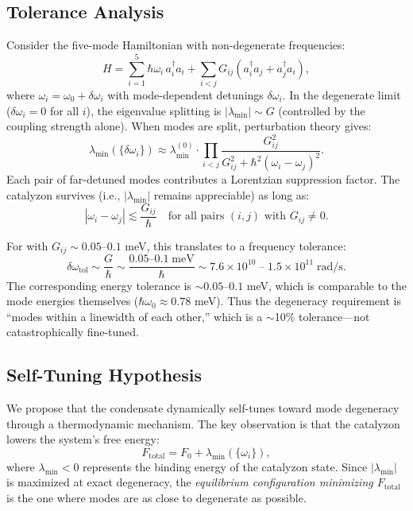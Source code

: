 \documentclass[11pt,letterpaper]{article}
\begin{document}
\subsection{Tolerance Analysis}

Consider the five-mode Hamiltonian with non-degenerate frequencies:
\begin{equation}
H = \sum_{i=1}^5 \hbar\omega_i \, a_i^\dagger a_i + \sum_{i < j} G_{ij}(a_i^\dagger a_j + a_j^\dagger a_i),
\label{eq:nondegenerate_H}
\end{equation}
where $\omega_i = \omega_0 + \delta\omega_i$ with mode-dependent detunings $\delta\omega_i$. In the degenerate limit ($\delta\omega_i = 0$ for all $i$), the eigenvalue splitting is $|\lambda_{\min}| \sim G$ (controlled by the coupling strength alone). When modes are split, perturbation theory gives:
\begin{equation}
\lambda_{\min}(\{\delta\omega_i\}) \approx \lambda_{\min}^{(0)} \cdot \prod_{i < j} \frac{G_{ij}^2}{G_{ij}^2 + \hbar^2(\omega_i - \omega_j)^2}.
\end{equation}
Each pair of far-detuned modes contributes a Lorentzian suppression factor. The catalyzon survives (i.e., $|\lambda_{\min}|$ remains appreciable) as long as:
\begin{equation}
\boxed{|\omega_i - \omega_j| \lesssim \frac{G_{ij}}{\hbar} \quad \text{for all pairs } (i,j) \text{ with } G_{ij} \neq 0.}
\label{eq:tolerance_criterion}
\end{equation}

For \MATBG{} with $G_{ij} \sim 0.05$--$0.1$ meV, this translates to a frequency tolerance:
\begin{equation}
\delta\omega_{\text{tol}} \sim \frac{G}{\hbar} \sim \frac{0.05\text{--}0.1 \;\text{meV}}{\hbar} \sim 7.6 \times 10^{10} \;\text{--}\; 1.5 \times 10^{11} \;\text{rad/s}.
\end{equation}
The corresponding energy tolerance is $\sim 0.05$--$0.1$ meV, which is comparable to the mode energies themselves ($\hbar\omega_0 \approx 0.78$ meV). Thus the degeneracy requirement is ``modes within a linewidth of each other,'' which is a $\sim$10\% tolerance---not catastrophically fine-tuned.

\subsection{Self-Tuning Hypothesis}

We propose that the \TEVC{} condensate dynamically self-tunes toward mode degeneracy through a thermodynamic mechanism. The key observation is that the catalyzon lowers the system's free energy:
\begin{equation}
F_{\text{total}} = F_0 + \lambda_{\min}(\{\omega_i\}),
\end{equation}
where $\lambda_{\min} < 0$ represents the binding energy of the catalyzon state. Since $|\lambda_{\min}|$ is maximized at exact degeneracy, the \textit{equilibrium configuration minimizing $F_{\text{total}}$} is the one where modes are as close to degenerate as possible.
\end{document}
